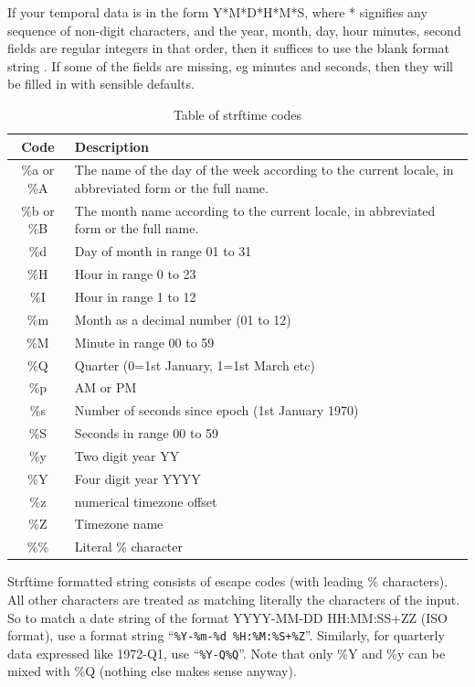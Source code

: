 If your temporal data is in the form Y{*}M{*}D{*}H{*}M{*}S, where
{*} signifies any sequence of non-digit characters, and the year,
month, day, hour minutes, second fields are regular integers in that
order, then it suffices to use the blank format string .
If some of the fields are missing, eg minutes and seconds, then they
will be filled in with sensible defaults.
\begin{center}
\par\end{center}

\begin{table}
\begin{tabular}{|c|l|}
\hline 
Code  & Description \tabularnewline
\hline 
\%a or \%A  & The name of the day of the week according to the current locale, in
abbreviated form or the full name.\tabularnewline
\%b or \%B  & The month name according to the current locale, in abbreviated form
or the full name.\tabularnewline
\%d  & Day of month in range 01 to 31\tabularnewline
\%H  & Hour in range 0 to 23\tabularnewline
\%I  & Hour in range 1 to 12\tabularnewline
\%m  & Month as a decimal number (01 to 12)\tabularnewline
\%M  & Minute in range 00 to 59\tabularnewline
\%Q  & Quarter (0=1st January, 1=1st March etc)\tabularnewline
\%p  & AM or PM\tabularnewline
\%s  & Number of seconds since epoch (1st January 1970)\tabularnewline
\%S  & Seconds in range 00 to 59 \tabularnewline
\%y  & Two digit year YY\tabularnewline
\%Y  & Four digit year YYYY\tabularnewline
\%z  & numerical timezone offset\tabularnewline
\%Z  & Timezone name\tabularnewline
\%\%  & Literal \% character\tabularnewline
\hline 
\end{tabular}\caption{Table of strftime codes}
\label{Strftime code} 
\end{table}

Strftime formatted string consists of escape codes (with leading \%
characters). All other characters are treated as matching literally
the characters of the input. So to match a date string of the format
YYYY-MM-DD HH:MM:SS+ZZ (ISO format), use a format string ``\verb|%Y-%m-%d %H:%M:%S+%Z|''.
Similarly, for quarterly data expressed like 1972-Q1, use ``\verb+%Y-Q%Q+''.
Note that only \%Y and \%y can be mixed with \%Q (nothing else makes
sense anyway).

